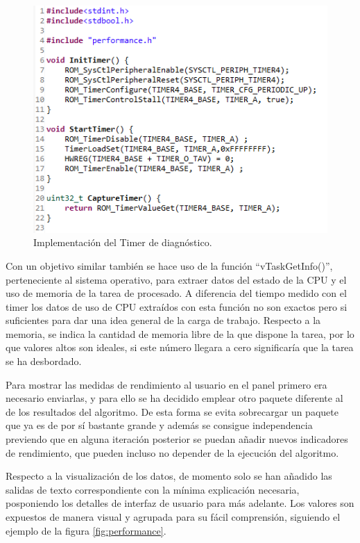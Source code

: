        \begin{figure}[H]
                \centering
                        \includegraphics[width = 0.7 \linewidth]{figuras/Timer.PNG}
                \caption{Implementación del Timer de diagnóstico.}
                \label{fig:timer}
        \end{figure}
        
        Con un objetivo similar también se hace uso de la función ``vTaskGetInfo()'', perteneciente al sistema operativo, para extraer datos del estado de la CPU y el uso de memoria de la tarea de procesado. A diferencia del tiempo medido con el timer los datos de uso de CPU extraídos con esta función no son exactos pero si suficientes para dar una idea general de la carga de trabajo. Respecto a la memoria, se indica la cantidad de memoria libre de la que dispone la tarea, por lo que valores altos son ideales, si este número llegara a cero significaría que la tarea se ha desbordado. 
        
        Para mostrar las medidas de rendimiento al usuario en el panel primero era necesario enviarlas, y para ello se ha decidido emplear otro paquete diferente al de los resultados del algoritmo. De esta forma se evita sobrecargar un paquete que ya es de por sí bastante grande y además se consigue independencia previendo que en alguna iteración posterior se puedan añadir nuevos indicadores de rendimiento, que pueden incluso no depender de la ejecución del algoritmo.
        
        Respecto a la visualización de los datos, de momento solo se han añadido las salidas de texto correspondiente con la mínima explicación necesaria, posponiendo los detalles de interfaz de usuario para más adelante. Los valores son expuestos de manera visual y agrupada para su fácil comprensión, siguiendo el ejemplo de la figura \ref{fig:performance}.
        

